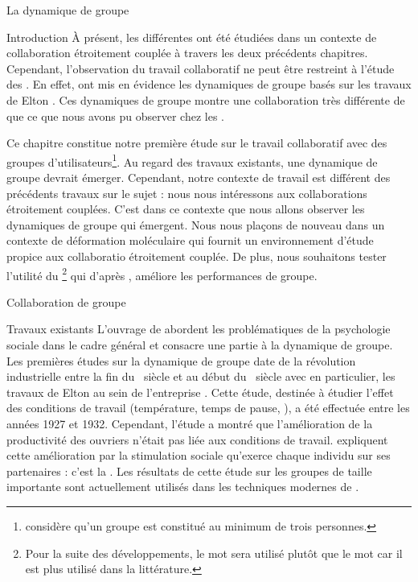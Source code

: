 \documentclass[myfrancais,ngerman,english,frenchb]{mythesis}
\begin{document}
	\begin{mychapter}{La dynamique de groupe}
		\begin{mysection}{Introduction}
			À présent, les différentes  ont été étudiées dans un contexte de collaboration étroitement couplée à travers les deux précédents chapitres.
			Cependant, l'observation du travail collaboratif ne peut être restreint à l'étude des .
			En effet,  ont mis en évidence les dynamiques de groupe basés sur les travaux de Elton .
			Ces dynamiques de groupe montre une collaboration très différente de que ce que nous avons pu observer chez les .

			Ce chapitre constitue notre première étude sur le travail collaboratif avec des groupes d'utilisateurs\footnote{ considère qu'un groupe est constitué au minimum de trois personnes.}.
			Au regard des travaux existants, une dynamique de groupe devrait émerger.
			Cependant, notre contexte de travail est différent des précédents travaux sur le sujet : nous nous intéressons aux collaborations étroitement couplées.
			C'est dans ce contexte que nous allons observer les dynamiques de groupe qui émergent.
			Nous nous plaçons de nouveau dans un contexte de déformation moléculaire qui fournit un environnement d'étude propice aux collaboratio étroitement couplée.
			De plus, nous souhaitons tester l'utilité du \mybrainstorming\footnote{Pour la suite des développements, le mot \mybrainstorming sera utilisé plutôt que le mot  car il est plus utilisé dans la littérature.} qui d'après , améliore les performances de groupe.
		\end{mysection}
		\begin{mysection}{Collaboration de groupe}
			\begin{mysubsection}{Travaux existants}
				L'ouvrage de  abordent les problématiques de la psychologie sociale dans le cadre général et consacre une partie à la dynamique de groupe.
				Les premières études sur la dynamique de groupe date de la révolution industrielle entre la fin du ~siècle et au début du ~siècle avec en particulier, les travaux de Elton  au sein de l'entreprise \myHawthorne.
				Cette étude, destinée à étudier l'effet des conditions de travail (température, temps de pause, \myetc), a été effectuée entre les années 1927 et 1932.
				Cependant, l'étude a montré que l'amélioration de la productivité des ouvriers n'était pas liée aux conditions de travail.
				 expliquent cette amélioration par la stimulation sociale qu'exerce chaque individu sur ses partenaires : c'est la .
				Les résultats de cette étude sur les groupes de taille importante sont actuellement utilisés dans les techniques modernes de  .


\end{mysubsection}
\end{mysection}
\end{mychapter}
\end{document}

